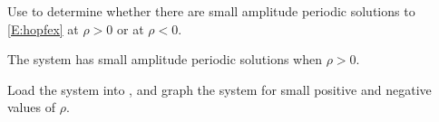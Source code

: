 \documentclass{ximera}
\begin{document}
\begin{exercise} \label{c9.4.4}
Use {\pplane} to determine whether there are small amplitude periodic 
solutions to \eqref{E:hopfex} at $\rho>0$ or at $\rho<0$.

\begin{solution}

\ans The system has small amplitude periodic solutions when $\rho > 0$.

\soln Load the system into \Matlab, and graph the
system for small positive and negative values of $\rho$.





\end{solution}
\end{exercise}
\end{document}
